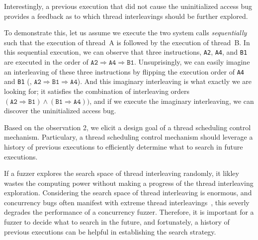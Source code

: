 

%
Interestingly, a previous execution that did not cause the
uninitialized access bug provides a feedback as to which thread
interleavings should be further explored.

To demonstrate this, let us assume we execute the two system calls
\textit{sequentially} such that the execution of thread~A is followed
by the execution of thread~B.
%
In this sequential execution, we can observe that three instructions,
\texttt{A2}, \texttt{A4}, and \texttt{B1} are executed in the order of
$\texttt{A2} \Rightarrow \texttt{A4} \Rightarrow \texttt{B1}$.
%
Unsuprisingly, we can easily imagine an interleaving of these three
instructions by flipping the execution order of \texttt{A4} and
\texttt{B1} (\ie,
$\texttt{A2} \Rightarrow \texttt{B1} \Rightarrow \texttt{A4}$).
%
And this imaginary interleaving is what exactly we are looking for; it
satisfies the combination of interleaving orders
$(\texttt{A2} \Rightarrow \texttt{B1}) \wedge (\texttt{B1} \Rightarrow
\texttt{A4}))$, and if we execute the imaginary interleaving, we can
discover the uninitialized access bug.



%
Based on the observation 2, we elicit a design goal of a thread
scheduling control mechanism.
%
Particulary, a thread scheduling control mechanism should leverage a
history of previous executions to efficiently determine what to search
in future executions.


If a fuzzer explores the search space of thread interleaving randomly,
it likley wastes the computing power without making a progress of the
thread interleaving exploration.
%
Considering the search space of thread interleaving is enormous, and
concurrency bugs often manifest with extreme thread
interleavings~\cite{cve20196974, cve20191999, cve201911486}, this
severly degrades the performance of a concurrency fuzzer.
%
Therefore, it is important for a fuzzer to decide what to search in
the future, and fortunately, a history of previous executions can be
helpful in establishing the search strategy.





